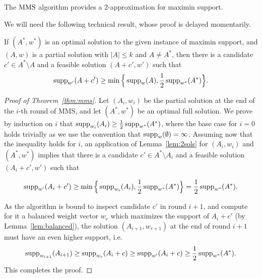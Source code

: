 \begin{theorem}\label{thm:mms}
The $\operatorname{MMS}$ algorithm provides a 2-approximation for maximin support.
\end{theorem}

We will need the following technical result, whose proof is delayed momentarily. 

\begin{lemma}\label{lem:2sols}
If $(A^*, w^*)$ is an optimal solution to the given instance of maximin support, and $(A,w)$ is a partial solution with $|A|\leq k$ and $A\neq A^*$, then there is a candidate $c'\in A^*\setminus A$ and a feasible solution $(A+c', w')$ such that 
$$\operatorname{supp}_{w'}(A+c')\geq \min\Big\{\operatorname{supp}_w(A), \frac{1}{2} \operatorname{supp}_{w^*}(A^*)\Big\}.$$
\end{lemma}


\begin{proof}[Proof of Theorem~\ref{thm:mms}]
Let $(A_i, w_i)$ be the partial solution at the end of the $i$-th round of MMS, and let $(A^*, w^*)$ be an optimal full solution. We prove by induction on $i$ that $\operatorname{supp}_{w_i}(A_i)\geq \frac{1}{2}\operatorname{supp}_{w^*}(A^*)$, where the base case for $i=0$ holds trivially as we use the convention that $\operatorname{supp}_w(\emptyset)=\infty$.
Assuming now that the inequality holds for $i$, an application of Lemma~\ref{lem:2sols} for $(A_i, w_i)$ and $(A^*, w^*)$ implies that there is a candidate $c'\in A^*\setminus A_i$ and a feasible solution $(A_i+c', w')$ such that 

$$\operatorname{supp}_{w'}(A_i+c')\geq \min\Big\{\operatorname{supp}_{w_i}(A_i), \frac{1}{2} \operatorname{supp}_{w^*}(A^*)\Big\} = \frac{1}{2} \operatorname{supp}_{w^*}(A^*).$$

As the algorithm is bound to inspect candidate $c'$ in round $i+1$, and compute for it a balanced weight vector $w_c$ which maximizes the support of $A_i+c'$ (by Lemma~\ref{lem:balanced}), the solution $(A_{i+1}, w_{r+1})$ at the end of round $i+1$ must have an even higher support, i.e. %
%
$$\operatorname{supp}_{w_{i+1}}(A_{i+1})\geq \operatorname{supp}_{w_c}(A_i+c) 
\geq \operatorname{supp}_{w'}(A_i+c) \geq \frac{1}{2} \operatorname{supp}_{w^*}(A^*).$$
%
This completes the proof.
\end{proof}

